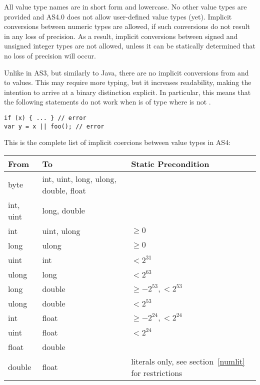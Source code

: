 All value type names are in short form and lowercase. No other value types are
provided and AS4.0 does not allow user-defined value types (yet).
Implicit conversions between numeric types are allowed, if such conversions do
not result in any loss of precision. As a result, implicit conversions between
signed and unsigned integer types are not allowed, unless it can be statically
determined that no loss of precision will occur.

Unlike in AS3, but
similarly to Java, there are no implicit conversions from and to
 values. This may require more typing, but it increases
readability, making the intention to arrive at a binary distinction explicit.
In particular, this means that the following statements
do not work when  is of type  where  is not .

\begin{verbatim}
if (x) { ... } // error
var y = x || foo(); // error
\end{verbatim}

This is the complete list of implicit coercions between value types in AS4:

\begin{center}
\begin{tabular}{| l | l | l |}
\hline
  From     & To & Static Precondition \\
\hline
  byte     & int, uint, long, ulong, double, float & \\
\hline
  int, uint     & long, double & \\
\hline
  int      & uint, ulong & $\geq 0$ \\
\hline
  long      & ulong & $\geq 0$   \\
\hline
  uint     & int  &  $<2^{31}$\\
\hline
  ulong    & long & $< 2^{63}$ \\
\hline
  long      & double & $\geq-2^{53}, < 2^{53}$   \\
\hline
  ulong      & double & $<2^{53}$   \\
\hline
  int      & float & $\geq-2^{24}, < 2^{24}$   \\
\hline
  uint      & float & $<2^{24}$   \\
\hline
  float      & double & \\
\hline
  double      & float & literals only, see section~\ref{numlit} for restrictions
  \\
\hline
\end{tabular}
\end{center}

